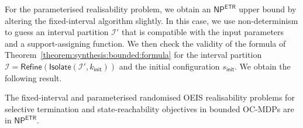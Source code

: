 \documentclass[a4paper,UKenglish,cleveref,autoref,thm-restate,colorlinks]{lipics-v2021}
\newcommand{\init}{\mathsf{init}}
\newcommand{\np}{\textsf{NP}}
\newcommand{\etr}{\textsf{ETR}}
\newcommand{\ocCount}{k}
\newcommand{\ocConfig}{s}
\newcommand{\intPart}{\mathcal{I}}
\begin{document}
For the parameterised realisability problem, we obtain an $\np^\etr$ upper bound by altering the fixed-interval algorithm slightly.
In this case, we use non-determinism to guess an interval partition $\intPart'$ that is compatible with the input parameters and a support-assigning function.
We then check the validity of the formula of Theorem~\ref{theorem:synthesis:bounded:formula} for the interval partition $\intPart=\mathsf{Refine}(\mathsf{Isolate}(\intPart', \ocCount_\init))$ and the initial configuration $\ocConfig_\init$.
We obtain the following result.

\begin{theorem}\label{theorem:realisability:bounded:randomised}
    The fixed-interval and parameterised randomised OEIS realisability problems for selective termination and state-reachability objectives in bounded OC-MDPs are in $\np^\etr$.
\end{theorem}
\end{document}
